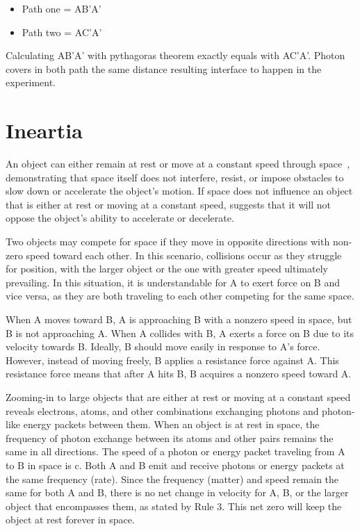 \documentclass{article}
\begin{document}
    \begin{itemize}
        \item Path one = AB'A'
        \item Path two = AC'A'
    \end{itemize}

    Calculating AB'A' with pythagoras theorem exactly equals with AC'A'. Photon covers in both path the same distance resulting interface to happen in the experiment.


    \section{Ineartia}\label{sec:ineartia}
    An object can either remain at rest or move at a constant speed through space~\cite{newton1687principia}, demonstrating that space itself does not interfere, resist, or impose obstacles to slow down or accelerate the object’s motion.
    If space does not influence an object that is either at rest or moving at a constant speed, suggests that it will not oppose the object’s ability to accelerate or decelerate.

    Two objects may compete for space if they move in opposite directions with non-zero speed toward each other.
    In this scenario, collisions occur as they struggle for position, with the larger object or the one with greater speed ultimately prevailing.
    In this situation, it is understandable for A to exert force on B and vice versa, as they are both traveling to each other competing for the same space.

    When A moves toward B, A is approaching B with a nonzero speed in space, but B is not approaching A. When A collides with B, A exerts a force on B due to its velocity  towards B. Ideally, B should move easily in response to A’s force.
    However, instead of moving freely, B applies a resistance force against A. This resistance force means that after A hits B, B acquires a nonzero speed toward A.

    Zooming-in to large objects that are either at rest or moving at a constant speed reveals electrons, atoms, and other combinations exchanging photons and photon-like energy packets between them.
     When an object is at rest in space, the frequency of photon exchange between its atoms and other pairs remains the same in all directions.
     The speed of a photon or energy packet traveling from A to B in space is c.
     Both A and B emit and receive photons or energy packets at the same frequency (rate).
     Since the frequency (matter) and speed remain the same for both A and B, there is no net change in velocity for A, B, or the larger object that encompasses them, as stated by Rule 3.
      This net zero will keep the object at rest forever in space.
\end{document}
